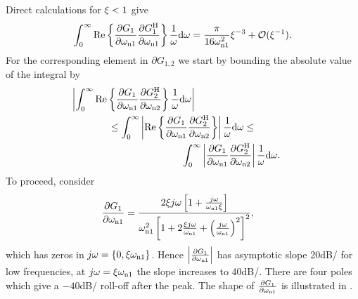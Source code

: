 Direct calculations for $\damping < 1$ give
\begin{align}
\label{eq:auto}
\int_0^\infty\mathrm{Re}\left\{\frac{\partial G_1}{\partial \wn[1]}\frac{\partial G_1^{\HT}}{\partial \wn[1]}\right\}\frac{1}{\omega}\dd\omega = \frac{\pi}{16\wn[1]^2}\damping^{-3} + \mathcal{O}(\damping^{-1}).
\end{align}
For the corresponding element in $\partial G_{1,2}$ we start by bounding the absolute value of the integral by
\begin{gather}
\left|\int_0^\infty\mathrm{Re}\left\{\frac{\partial G_1}{\partial \wn[1]}\frac{\partial G_2^{\HT}}{\partial \wn[2]}\right\}\frac{1}{\omega}\dd\omega\right|
\qquad \qquad \qquad \qquad \qquad
\label{eq:cross1} \\
\leq
\int_0^\infty\left|\mathrm{Re}\left\{\frac{\partial G_1}{\partial \wn[1]}\frac{\partial G_2^{\HT}}{\partial \wn[2]}\right\}\right|\frac{1}{\omega}\dd\omega
\leq \\
\qquad \qquad \qquad \qquad \qquad
\int_0^\infty\left|\frac{\partial G_1}{\partial \wn[1]}\frac{\partial G_2^{\HT}}{\partial \wn[2]}\right|\frac{1}{\omega}\dd\omega \text{.}\label{eq:cross}
\end{gather}
To proceed, consider
\begin{align}
\frac{\partial G_1}{\partial \wn[1]} &= \frac{2\damping j\omega\left[1+\frac{j\omega}{\wn[1]\damping}\right]}{\wn[1]^2\left[1+2\frac{\damping j\omega}{\wn[1]} + \left(\frac{j\omega}{\wn[1]}\right)^2\right]^2},
\end{align}
which has zeros in $j\omega=\left\{0, \damping\wn[1]\right\}$. 
Hence $\left|\frac{\partial G_1}{\partial \wn[1]} \right|$ has asymptotic slope 20\unit{dB/\decade} for low frequencies, at $j\omega=\damping\wn[1]$ the slope increases to 40\unit{dB/\decade}. There are four poles which give a $-40$\unit{dB/\decade} roll-off after the peak. 
The shape of $\frac{\partial G_1}{\partial \wn[1]} $ is illustrated in .

